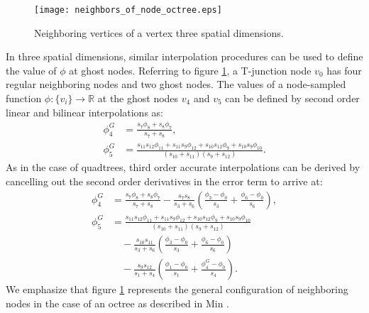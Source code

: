 \documentclass[english]{article}
\begin{document}
\begin{figure}
\begin{center}\texttt{[image: neighbors\_of\_node\_octree.eps]}
\end{center}
\caption{Neighboring vertices of a vertex three spatial
dimensions.\label{fig_T_junction_octree}}
\end{figure}

In three spatial dimensions, similar interpolation procedures can be used
to define the value of $\phi$ at ghost nodes. Referring to figure
\ref{fig_T_junction_octree}, a T-junction node $v_0$ has four regular
neighboring nodes and two ghost nodes. The values of a node-sampled
function $\phi:\{v_i\}\to\mathbb{R}$ at the ghost nodes $v_4$ and $v_5$ can
be defined by second order linear and bilinear interpolations as:
\begin{equation}
\begin{split}
\phi_4^G &= \frac{s_7\phi_8+s_8\phi_7}{s_7+s_8}, \\
\phi_5^G &= \frac{ s_{11}s_{12}\phi_{11}+ s_{11}s_{ 9}\phi_{12}+
s_{10}s_{12}\phi_{ 9}+ s_{10}s_{9}\phi_{10} }
{(s_{10}+s_{11})(s_{9}+s_{12})}.
\end{split}
\label{eq_linear_interpolation_ghost_node_in_octree}
\end{equation}
As in the case of quadtrees, third order accurate interpolations can be
derived by cancelling out the second order derivatives in the error term to
arrive at:
\begin{equation}
\begin{split}
\phi_4^G &= \frac{s_7\phi_8+s_8\phi_7}{s_7+s_8}
           - \frac{s_7s_8}{s_3+s_6}
            \left( \frac{\phi_3-\phi_0}{s_3} +
                   \frac{\phi_6-\phi_0}{s_6}
            \right), \\
\phi_5^G &= \frac{
s_{11}s_{12}\phi_{11}+
s_{11}s_{ 9}\phi_{12}+
s_{10}s_{12}\phi_{ 9}+
s_{10}s_{9}\phi_{10}
}{(s_{10}+s_{11})(s_{9}+s_{12})} \\
          &\quad - \frac{s_{10}s_{11}}{s_3+s_6}
            \left( \frac{\phi_3-\phi_0}{s_3} +
                   \frac{\phi_6-\phi_0}{s_6}
            \right) \\
          &\quad - \frac{s_{9}s_{12}}{s_1+s_4}
            \left( \frac{\phi_1-\phi_0}{s_1} +
                   \frac{\phi_4^G-\phi_0}{s_4}
            \right).
\end{split}
\label{eq_quadratic_interpolation_ghost_node_in_octree}
\end{equation}
We emphasize that figure \ref{fig_T_junction_octree} represents the general
configuration of neighboring nodes in the case of an octree as described in
Min \etal \cite{Min::Poisson_AMR_Second_Order}.
\end{document}
